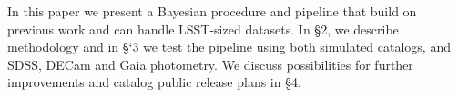 In this paper we present a Bayesian procedure and pipeline that build on previous work and can handle LSST-sized datasets.
In \S2, we describe methodology and in \S`3 we test the pipeline using both simulated catalogs, and SDSS, DECam and Gaia
photometry. We discuss possibilities for further improvements and catalog public release plans in \S4. 
